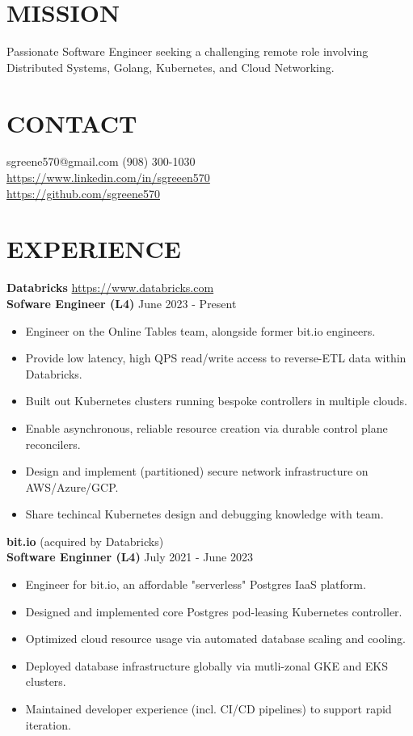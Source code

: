 \documentclass[line, margin, 10.5pt]{res}
\begin{document}

\begin{resume}

\section{\small MISSION}
Passionate Software Engineer seeking a challenging remote role involving Distributed Systems, Golang, Kubernetes, and Cloud Networking.

\section{\small CONTACT}
sgreene570@gmail.com \hfill (908) 300-1030 \\
\url{https://www.linkedin.com/in/sgreeen570} \\
\url{https://github.com/sgreene570}

\section{\small EXPERIENCE}
{\bf \large{Databricks}} \hfill \url{https://www.databricks.com} \\
{\bf Sofware Engineer (L4)} \hfill June 2023 - Present
\begin{itemize}
    \item Engineer on the Online Tables team, alongside former bit.io engineers.
    \item Provide low latency, high QPS read/write access to reverse-ETL data within Databricks.
    \item Built out Kubernetes clusters running bespoke controllers in multiple clouds.
    \item Enable asynchronous, reliable resource creation via durable control plane reconcilers.
    \item Design and implement (partitioned) secure network infrastructure on AWS/Azure/GCP.
    \item Share techincal Kubernetes design and debugging knowledge with team.
\end{itemize}

{\bf \large{bit.io}} \hfill (acquired by Databricks) \\
{\bf Software Enginner (L4)} \hfill July 2021 - June 2023
\begin{itemize}
    \item Engineer for bit.io, an affordable "serverless" Postgres IaaS platform.
    \item Designed and implemented core Postgres pod-leasing Kubernetes controller.
    \item Optimized cloud resource usage via automated database scaling and cooling.
    \item Deployed database infrastructure globally via mutli-zonal GKE and EKS clusters.
    \item Maintained developer experience (incl. CI/CD pipelines) to support rapid iteration.
\end{itemize}


\end{resume}
\end{document}
